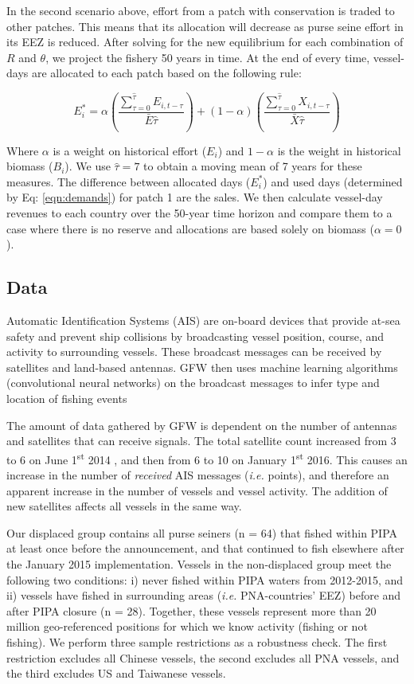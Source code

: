 \documentclass[12pt]{article}
\begin{document}
In the second scenario above, effort from a patch with conservation is traded to other patches. This means that its allocation will decrease as purse seine effort in its EEZ is reduced. After solving for the new equilibrium for each combination of $R$ and $\theta$, we project the fishery 50 years in time. At the end of every time, vessel-days are allocated to each patch based on the following rule:

$$
E_i^* = \alpha \left(\frac{\sum_{\tau = 0}^{\hat{\tau}}E_{i,t-\tau}}{\bar{E}\hat{\tau}} \right) +
(1 - \alpha) \left(\frac{\sum_{\tau = 0}^{\hat{\tau}}X_{i,t-\tau}}{\bar{X}\hat{\tau}} \right)
$$

Where  $\alpha$ is a weight on historical effort ($E_i$) and $1-\alpha$ is the weight in historical biomass ($B_i$). We use $\hat{\tau}= 7$ to obtain a moving mean of 7 years for these measures. The difference between allocated days ($E_i^*$) and used days (determined by Eq: \ref{eqn:demands}) for patch 1 are the sales. We then calculate vessel-day revenues to each country over the 50-year time horizon and compare them to a case where there is no reserve and allocations are based solely on biomass ($\alpha = 0$).

\subsection{Data}

Automatic Identification Systems (AIS) are on-board devices that provide at-sea safety and prevent ship collisions by broadcasting vessel position, course, and activity to surrounding vessels. These broadcast messages can be received by satellites and land-based antennas. GFW then uses machine learning algorithms (convolutional neural networks) on the broadcast messages to infer type and location of fishing events \cite{kroodsma_2018}

The amount of data gathered by GFW is dependent on the number of antennas and satellites that can receive signals. The total satellite count increased from 3 to 6 on June 1\textsuperscript{st} 2014 , and then from 6 to 10 on January 1\textsuperscript{st} 2016. This causes an increase in the number of \emph{received} AIS messages (\emph{i.e.} points), and therefore an apparent increase in the number of vessels and vessel activity. The addition of new satellites affects all vessels in the same way.

Our displaced group contains all purse seiners (n = 64) that fished within PIPA at least once before the announcement, and that continued to fish elsewhere after the January 2015 implementation. Vessels in the non-displaced group meet the following two conditions: i) never fished within PIPA waters from 2012-2015, and ii) vessels have fished in surrounding areas (\emph{i.e.} PNA-countries' EEZ) before and after PIPA closure (n = 28). Together, these vessels represent more than 20 million geo-referenced positions for which we know activity (fishing or not fishing). We perform three sample restrictions as a robustness check. The first restriction excludes all Chinese vessels, the second excludes all PNA vessels, and the third excludes US and Taiwanese vessels.
\end{document}

